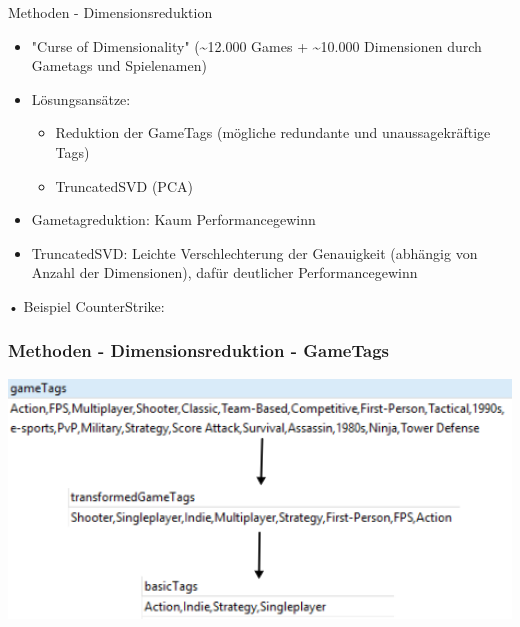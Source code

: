 \documentclass[12pt]{beamer}
\begin{document}
\begin{frame}{Methoden - Dimensionsreduktion}
	\begin{itemize}
	\item "Curse of Dimensionality" (\textasciitilde 12.000 Games + \textasciitilde 10.000 Dimensionen durch Gametags und Spielenamen)
	\item Lösungsansätze:
		\begin{itemize}
		\item Reduktion der GameTags (mögliche redundante und unaussagekräftige Tags)
		\item TruncatedSVD (PCA)
		\end{itemize}
	\item Gametagreduktion: Kaum Performancegewinn
	\item TruncatedSVD: Leichte Verschlechterung der Genauigkeit (abhängig von Anzahl der Dimensionen), dafür deutlicher Performancegewinn
	\end{itemize}
\end{frame}

\begin{frame}{•}
	Beispiel CounterStrike: \newline \newblock
	\frametitle{Methoden - Dimensionsreduktion - GameTags}
	\includegraphics[width=1\textwidth]{img/cs_gametag_reduction.png}
\end{frame}	
\end{document}
